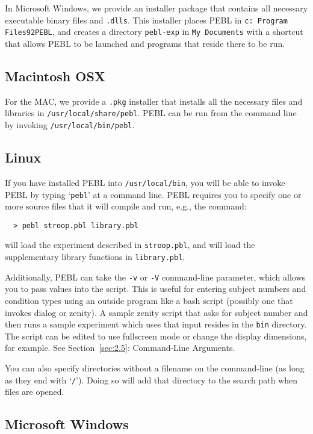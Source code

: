 In Microsoft Windows, we provide an installer package that contains
all necessary executable binary files and \texttt{.dlls}. This
installer places PEBL in \texttt{c: Program Files\char92PEBL},
and creates a directory \texttt{pebl-exp} in \texttt{My Documents}
with a shortcut that allows PEBL to be launched and programs that
reside there to be run.

\subsection{Macintosh OSX}

For the MAC, we provide a \texttt{.pkg} installer that installs all the
necessary files and libraries in \texttt{/usr/local/share/pebl}.  PEBL can be
run from the command line by invoking \texttt{/usr/local/bin/pebl}.




\subsection{Linux}

If you have installed PEBL into \texttt{/usr/local/bin}, you will be able to
invoke PEBL by typing `\texttt{pebl}' at a command line.  PEBL requires you to
specify one or more source files that it will compile and run, e.g., the
command:
\begin{verbatim}
  > pebl stroop.pbl library.pbl
\end{verbatim}
will load the experiment described in \texttt{stroop.pbl}, and will load the
supplementary library functions in \texttt{library.pbl}.

Additionally, PEBL can take the \texttt{-v} or \texttt{-V} command-line parameter, which allows you to pass values into the script.  This is useful for
entering subject numbers and condition types using an outside program
like a bash script (possibly one that invokes dialog or zenity). A sample zenity script that asks for subject number and then runs a sample experiment which uses that input resides in the \texttt{bin} directory. The script can be edited to use fullscreen mode or change the display dimensions, for example. See Section~\ref{sec:2.5}: Command-Line Arguments.

You can also specify directories without a filename on the command-line (as long as they end with `\texttt{/}').  Doing so will add that directory to the search path when files are opened.

\subsection{ Microsoft Windows}


